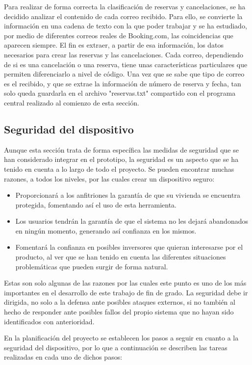 Para realizar de forma correcta la clasificación de reservas y cancelaciones, se ha decidido analizar el contenido de cada correo recibido. Para ello, se convierte la información en una cadena de texto con la que poder trabajar y se ha estudiado, por medio de diferentes correos reales de Booking.com, las coincidencias que aparecen siempre. El fin es extraer, a partir de esa información, los datos necesarios para crear las reservas y las cancelaciones.
Cada correo, dependiendo de si es una cancelación o una reserva, tiene unas características particulares que permiten diferenciarlo a nivel de código. Una vez que se sabe que tipo de correo es el recibido, y que se extrae la información de número de reserva y fecha, tan solo queda guardarla en el archivo "reservas.txt" compartido con el programa central realizado al comienzo de esta sección.
\subsection{Seguridad del dispositivo}
Aunque esta sección trata de forma específica las medidas de seguridad que se han considerado integrar en el prototipo, la seguridad es un aspecto que se ha tenido en cuenta a lo largo de todo el proyecto.
Se pueden encontrar muchas razones, a todos los niveles, por las cuales crear un dispositivo seguro:
\begin{itemize}
\item{Proporcionará a los anfitriones la garantía de que su vivienda se encuentra protegida, fomentando así el uso de esta herramienta.}
\item{Los usuarios tendrán la garantía de que el sistema no les dejará abandonados en ningún momento, generando así confianza en los mismos.}
\item{Fomentará la confianza en posibles inversores que quieran interesarse por el producto, al ver que se han tenido en cuenta las diferentes situaciones problemáticas que pueden surgir de forma natural.}
\end{itemize}
Estas son solo algunas de las razones por las cuales este punto es uno de los más importantes en el desarrollo de este trabajo de fin de grado. La seguridad debe ir dirigida, no solo a la defensa ante posibles ataques externos, si no también al hecho de responder ante posibles fallos del propio sistema que no hayan sido identificados con anterioridad.

En la planificación del proyecto se establecen los pasos a seguir en cuanto a la seguridad del dispositivo, por lo que a continuación se describen las tareas realizadas en cada uno de dichos pasos:

